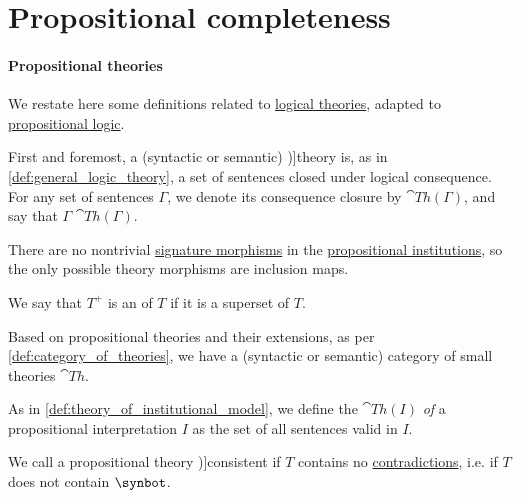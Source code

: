 \section{Propositional completeness}\label{sec:propositional_completeness}

\paragraph{Propositional theories}

\begin{definition}\label{def:propositional_theory}\mimprovised
  We restate here some definitions related to \hyperref[def:logical_theory]{logical theories}, adapted to \hyperref[def:propositional_logic]{propositional logic}.

  First and foremost, a (syntactic or semantic) \term[en=theory (\cite[def. 1.4.5]{Hinman2005Logic})]{theory} is, as in \cref{def:general_logic_theory}, a set of sentences closed under logical consequence. For any set of sentences \( \Gamma \), we denote its consequence closure by \( \cat{Th}(\Gamma) \), and say that \( \Gamma \)  \( \cat{Th}(\Gamma) \).

  \begin{thmenum}
     There are no nontrivial \hyperref[def:institution/signatures]{signature morphisms} in the \hyperref[def:propositional_institution]{propositional institutions}, so the only possible theory morphisms are inclusion maps.

     We say that \( T^+ \) is an  of \( T \) if it is a superset of \( T \).

     Based on propositional theories and their extensions, as per \cref{def:category_of_theories}, we have a (syntactic or semantic) category of small theories \( \cat{Th} \).

     As in \cref{def:theory_of_institutional_model}, we define the  \( \cat{Th}(I) \) \emph{of} a propositional interpretation \( I \) as the set of all sentences valid in \( I \).

     We call a propositional theory \term[ru=противоречивое (множество формул) (\cite[def. 1.3.15]{Герасимов2014Вычислимость})]{consistent} if \( T \) contains no \hyperref[def:propositional_semantics/tautology]{contradictions}, i.e. if \( T \) does not contain \( \synbot \).


\end{thmenum}
\end{definition}
